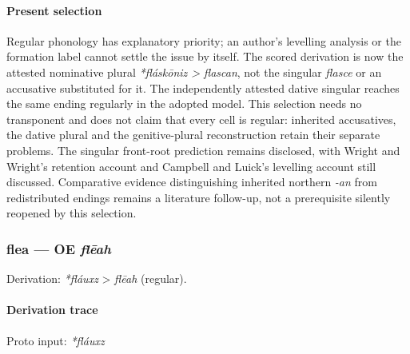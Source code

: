 \documentclass[
  british,
  a4paper,
]{article}
\begin{document}
\paragraph{Present selection}\label{present-selection}

Regular phonology has explanatory priority; an author's levelling
analysis or the formation label cannot settle the issue by itself. The
scored derivation is now the attested nominative plural
\emph{*fláskōniz >} \emph{flascan}, not the singular \emph{flasce} or an
accusative substituted for it. The independently attested dative
singular reaches the same ending regularly in the adopted model. This
selection needs no transponent and does not claim that every cell is
regular: inherited accusatives, the dative plural and the
genitive-plural reconstruction retain their separate problems. The
singular front-root prediction remains disclosed, with Wright and
Wright's retention account and Campbell and Luick's levelling account
still discussed. Comparative evidence distinguishing inherited northern
\emph{-an} from redistributed endings remains a literature follow-up,
not a prerequisite silently reopened by this selection.

\subsubsection{\texorpdfstring{flea --- OE
\emph{flēah}}{flea --- OE flēah}}\label{flea-oe-flux113ah}

Derivation: \emph{*fláuxz} \textgreater{} \emph{flēah} (regular).

\paragraph{Derivation trace}\label{derivation-trace-26}

Proto input: \emph{*fláuxz}

\begingroup
\setlength{\fboxsep}{6pt}
\end{document}
